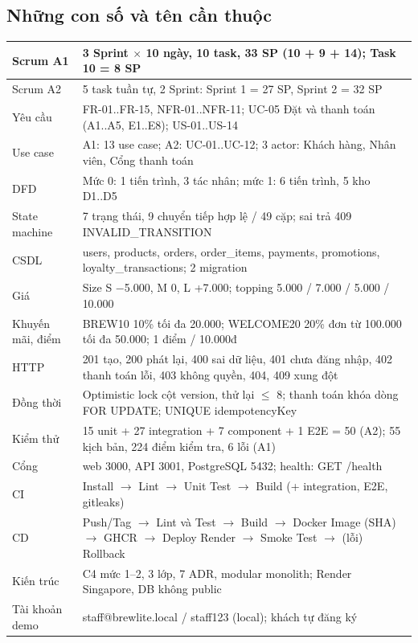 \documentclass[11pt,a4paper]{article}
\begin{document}
\subsection*{Những con số và tên cần thuộc}
\renewcommand{\arraystretch}{1.25}
\begin{longtable}{|p{4.2cm}|p{11.8cm}|}
\hline
Scrum A1 & 3 Sprint $\times$ 10 ngày, 10 task, 33 SP (10 + 9 + 14); Task 10 = 8 SP \\ \hline
Scrum A2 & 5 task tuần tự, 2 Sprint: Sprint 1 = 27 SP, Sprint 2 = 32 SP \\ \hline
Yêu cầu & FR-01..FR-15, NFR-01..NFR-11; UC-05 Đặt và thanh toán (A1..A5, E1..E8); US-01..US-14 \\ \hline
Use case & A1: 13 use case; A2: UC-01..UC-12; 3 actor: Khách hàng, Nhân viên, Cổng thanh toán \\ \hline
DFD & Mức 0: 1 tiến trình, 3 tác nhân; mức 1: 6 tiến trình, 5 kho D1..D5 \\ \hline
State machine & 7 trạng thái, 9 chuyển tiếp hợp lệ / 49 cặp; sai trả 409 INVALID\_TRANSITION \\ \hline
CSDL & users, products, orders, order\_items, payments, promotions, loyalty\_transactions; 2 migration \\ \hline
Giá & Size S $-$5.000, M 0, L +7.000; topping 5.000 / 7.000 / 5.000 / 10.000 \\ \hline
Khuyến mãi, điểm & BREW10 10\% tối đa 20.000; WELCOME20 20\% đơn từ 100.000 tối đa 50.000; 1 điểm / 10.000đ \\ \hline
HTTP & 201 tạo, 200 phát lại, 400 sai dữ liệu, 401 chưa đăng nhập, 402 thanh toán lỗi, 403 không quyền, 404, 409 xung đột \\ \hline
Đồng thời & Optimistic lock cột version, thử lại $\le$ 8; thanh toán khóa dòng FOR UPDATE; UNIQUE idempotencyKey \\ \hline
Kiểm thử & 15 unit + 27 integration + 7 component + 1 E2E = 50 (A2); 55 kịch bản, 224 điểm kiểm tra, 6 lỗi (A1) \\ \hline
Cổng & web 3000, API 3001, PostgreSQL 5432; health: GET /health \\ \hline
CI & Install $\rightarrow$ Lint $\rightarrow$ Unit Test $\rightarrow$ Build (+ integration, E2E, gitleaks) \\ \hline
CD & Push/Tag $\rightarrow$ Lint và Test $\rightarrow$ Build $\rightarrow$ Docker Image (SHA) $\rightarrow$ GHCR $\rightarrow$ Deploy Render $\rightarrow$ Smoke Test $\rightarrow$ (lỗi) Rollback \\ \hline
Kiến trúc & C4 mức 1–2, 3 lớp, 7 ADR, modular monolith; Render Singapore, DB không public \\ \hline
Tài khoản demo & staff@brewlite.local / staff123 (local); khách tự đăng ký \\ \hline
\end{longtable}
\end{document}
